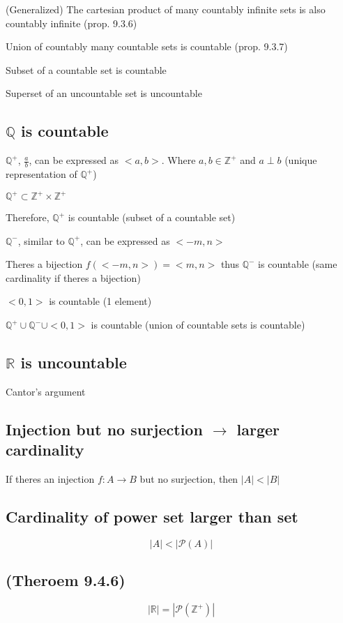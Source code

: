 \documentclass[12pt]{article}
\begin{document}
\begin{spacing}{1.5}
\begin{itemize*}
	\item (Generalized) The cartesian product of many countably infinite sets is also countably infinite (prop. 9.3.6)
	
	\item Union of countably many countable sets is countable (prop. 9.3.7)
	
	\item Subset of a countable set is countable
	
	\item Superset of an uncountable set is uncountable
\end{itemize*}

\subsection{$\mathbb{Q}$ is countable}

\begin{enumerate*}
	\item $\mathbb{Q}^+$, $\frac{a}{b}$, can be expressed as $<a, b>$. Where $a, b \in \mathbb{Z}^+$ and $a \perp b$ (unique representation of $\mathbb{Q}^+$)
	\item $\mathbb{Q}^+ \subset \mathbb{Z^+} \times \mathbb{Z^+}$
	\item Therefore, $\mathbb{Q}^+$ is countable (subset of a countable set)
	\item $\mathbb{Q}^-$, similar to $\mathbb{Q}^+$, can be expressed as $<-m, n>$
	\item Theres a bijection $f(<-m, n>) = <m, n>$ thus $\mathbb{Q}^-$ is countable (same cardinality if theres a bijection)
	\item ${<0, 1>}$ is countable (1 element)
	\item $\mathbb{Q}^+ \cup \mathbb{Q}^- \cup <0, 1>$ is countable (union of countable sets is countable)
\end{enumerate*}

\subsection{$\mathbb{R}$ is uncountable}

Cantor's argument

\subsection{Injection but no surjection $\rightarrow$ larger cardinality}

If theres an injection $f : A \rightarrow B$ but no surjection, then $|A| < |B|$

\subsection{Cardinality of power set larger than set}

$$|A| < |\mathcal{P}(A)|$$

\subsection{(Theroem 9.4.6)}

$$|\mathbb{R}| = |\mathcal{P}(\mathbb{Z}^+)|$$

\end{spacing}
\end{document}
